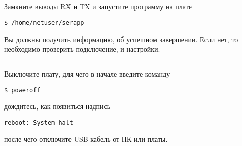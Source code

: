 \subsection{}Замкните выводы RX и TX и запустите программу на плате
\begin{lstlisting}[style=bash]
$ /home/netuser/serapp
\end{lstlisting}
Вы должны получить информацию, об успешном завершении. Если нет, то необходимо проверить подключение, и настройки.

\subsection{} Выключите плату, для чего в начале введите команду
\begin{lstlisting}[style=bash]
	$ poweroff
\end{lstlisting}
дождитесь, как появиться надпись
\begin{lstlisting}[style=stdout]
	reboot: System halt
\end{lstlisting}
после чего отключите USB кабель от ПК или платы. 